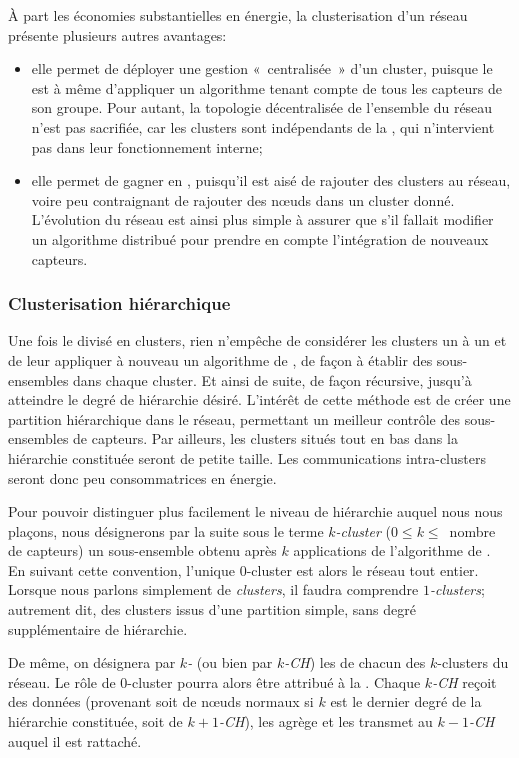 À part les économies substantielles en énergie, la clusterisation d'un réseau présente plusieurs autres avantages:
\begin{itemize}
    \item elle permet de déployer une gestion « centralisée » d'un cluster, puisque le \ch est à même d'appliquer un algorithme tenant compte de tous les capteurs de son groupe. Pour autant, la topologie décentralisée de l'ensemble du réseau n'est pas sacrifiée, car les clusters sont indépendants de la \sdb, qui n'intervient pas dans leur fonctionnement interne;
    \item elle permet de gagner en , puisqu'il est aisé de rajouter des clusters au réseau, voire peu contraignant de rajouter des nœuds dans un cluster donné. L'évolution du réseau est ainsi plus simple à assurer que s'il fallait modifier un algorithme distribué pour prendre en compte l'intégration de nouveaux capteurs.
\end{itemize}

        \subsubsection{Clusterisation hiérarchique}
Une fois le \rc divisé en clusters, rien n'empêche de considérer les clusters un à un et de leur appliquer à nouveau un algorithme de , de façon à établir des sous-ensembles dans chaque cluster.
Et ainsi de suite, de façon récursive, jusqu'à atteindre le degré de hiérarchie désiré.
L'intérêt de cette méthode est de créer une partition hiérarchique dans le réseau, permettant un meilleur contrôle des sous-ensembles de capteurs.
Par ailleurs, les clusters situés tout en bas dans la hiérarchie constituée seront de petite taille.
Les communications intra-clusters seront donc peu consommatrices en énergie.

Pour pouvoir distinguer plus facilement le niveau de hiérarchie auquel nous nous plaçons, nous désignerons par la suite sous le terme \textit{$k$-cluster} ($0 \leq k \leq$~nombre de capteurs) un sous-ensemble obtenu après $k$ applications de l'algorithme de .
En suivant cette convention, l'unique $0$-cluster est alors le réseau tout entier.
Lorsque nous parlons simplement de \textit{clusters}, il faudra comprendre \textit{$1$-clusters}; autrement dit, des clusters issus d'une partition simple, sans degré supplémentaire de hiérarchie.

De même, on désignera par \textit{$k$-\ch} (ou bien par \textit{$k$-CH}) les \chs de chacun des $k$-clusters du réseau.
Le rôle de $0$-cluster pourra alors être attribué à la \sdb.
Chaque \textit{$k$-CH} reçoit des données (provenant soit de nœuds normaux si $k$ est le dernier degré de la hiérarchie constituée, soit de \textit{$k+1$-CH}), les agrège et les transmet au \textit{$k-1$-CH} auquel il est rattaché.

